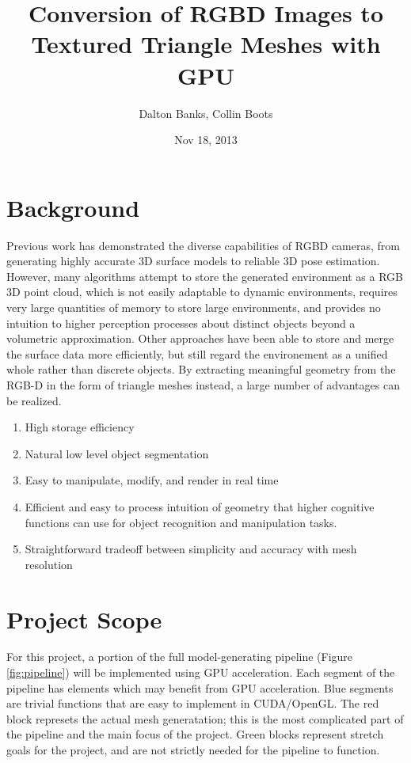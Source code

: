 \documentclass[letterpaper, 10 pt, conference]{ieeeconf}
\title{Conversion of RGBD Images to Textured Triangle Meshes with GPU}
\author{Dalton Banks, Collin Boots}
\date{Nov 18, 2013}
\begin{document}
   \maketitle


\section{Background} 
Previous work has demonstrated the diverse capabilities of RGBD cameras, from generating highly accurate 3D surface models to reliable 3D pose estimation. However, many algorithms attempt to store the generated environment as a RGB 3D point cloud, which is not easily adaptable to dynamic environments, requires very large quantities of memory to store large environments, and provides no intuition to higher perception processes about distinct objects beyond a volumetric approximation. Other approaches have been able to store and merge the surface data more efficiently, but still regard the environement as a unified whole rather than discrete objects. By extracting meaningful geometry from the RGB-D in the form of triangle meshes instead, a large number of advantages can be realized.

\begin{enumerate}
\item High storage efficiency
\item Natural low level object segmentation
\item Easy to manipulate, modify, and render in real time
\item Efficient and easy to process intuition of geometry that higher cognitive functions can use for object recognition and manipulation tasks.
\item Straightforward tradeoff between simplicity and accuracy with mesh resolution
\end{enumerate}

\section{Project Scope}
For this project, a portion of the full model-generating pipeline (Figure \ref{fig:pipeline}) will be implemented using GPU acceleration.  Each segment of the pipeline has elements which may benefit from GPU acceleration. Blue segments are trivial functions that are easy to implement in CUDA/OpenGL. The red block represets the actual mesh generatation; this is the most complicated part of the pipeline and the main focus of the project. Green blocks represent stretch goals for the project, and are not strictly needed for the pipeline to function. 
\end{document}
